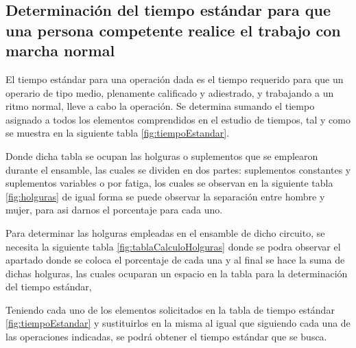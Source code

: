     \subsection{Determinación del tiempo estándar para que una persona competente realice el trabajo con marcha normal}
    

    El tiempo estándar para una operación dada es el tiempo requerido para que un operario de tipo medio, plenamente calificado y adiestrado, y trabajando a un ritmo normal, lleve a cabo la operación. Se determina sumando el tiempo asignado a todos los elementos comprendidos en el estudio de tiempos, tal y como se muestra en la siguiente tabla \ref{fig:tiempoEstandar}.
  
  
    Donde dicha tabla se ocupan las holguras o suplementos que se emplearon durante el ensamble, las cuales se dividen en dos partes: suplementos constantes y suplementos variables o por fatiga, los cuales se observan en la siguiente tabla \ref{fig:holguras} de igual forma se puede observar la separación entre hombre y mujer, para asi darnos el porcentaje para cada uno.
    
    Para determinar las holguras empleadas en el ensamble de dicho circuito, se necesita la siguiente tabla \ref{fig:tablaCalculoHolguras} donde se podra observar el apartado donde se coloca el porcentaje de cada una y al final se hace la suma de dichas holguras, las cuales ocuparan un espacio en la tabla para la determinación del tiempo estándar, 
  
  Teniendo cada uno de los elementos solicitados en la tabla de tiempo estándar \ref{fig:tiempoEstandar} y sustituirlos en la misma al igual que siguiendo cada una de las operaciones indicadas, se podrá obtener el tiempo estándar que se busca. 
    
